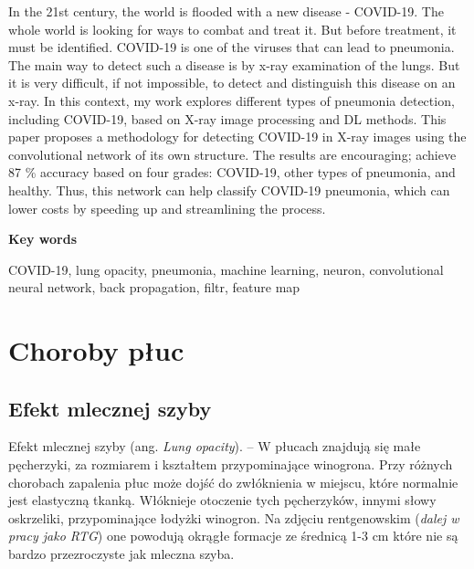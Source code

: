 \documentclass{article}
\begin{document}
In the 21st century, the world is flooded with a new disease - COVID-19. The whole world is looking for ways to combat and treat it. But before treatment, it must be identified. COVID-19 is one of the viruses that can lead to pneumonia. The main way to detect such a disease is by x-ray examination of the lungs. But it is very difficult, if not impossible, to detect and distinguish this disease on an x-ray. In this context, my work explores different types of pneumonia detection, including COVID-19, based on X-ray image processing and DL methods. This paper proposes a methodology for detecting COVID-19 in X-ray images using the convolutional network of its own structure. The results are encouraging; achieve 87 \% accuracy based on four grades: COVID-19, other types of pneumonia, and healthy. Thus, this network can help classify COVID-19 pneumonia, which can lower costs by speeding up and streamlining the process.\\

\begin{flushleft}
	\Large
	\textbf{Key words}
\end{flushleft}
COVID-19, lung opacity, pneumonia, machine learning, neuron, convolutional neural network, back propagation, filtr, feature map

\clearpage


\tableofcontents


\clearpage
{}
\setcounter{page}{1}

\section{Choroby płuc}

\subsection{Efekt mlecznej szyby}
Efekt mlecznej szyby (ang. \textit{Lung opacity}). – W płucach znajdują się małe pęcherzyki, za rozmiarem i kształtem przypominające winogrona. Przy różnych chorobach zapalenia płuc może dojść do zwłóknienia w miejscu, które normalnie jest elastyczną tkanką. Włóknieje otoczenie tych pęcherzyków, innymi słowy oskrzeliki, przypominające łodyżki winogron. Na zdjęciu rentgenowskim (\textit{dalej w pracy jako RTG}) one powodują okrągłe formacje ze średnicą 1-3 cm które nie są bardzo przezroczyste jak mleczna szyba.
\end{document}
